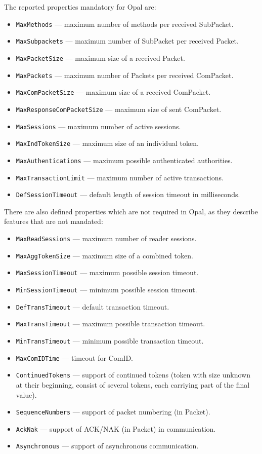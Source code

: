 The reported properties mandatory for Opal are:
\begin{itemize}
\item \verb|MaxMethods| --- maximum number of methods per received SubPacket.
\item \verb|MaxSubpackets| --- maximum number of SubPacket per received Packet.
\item \verb|MaxPacketSize| --- maximum size of a received Packet.
\item \verb|MaxPackets| --- maximum number of Packets per received ComPacket.
\item \verb|MaxComPacketSize| --- maximum size of a received ComPacket.
\item \verb|MaxResponseComPacketSize| --- maximum size of sent ComPacket.
\item \verb|MaxSessions| --- maximum number of active sessions.
\item \verb|MaxIndTokenSize| --- maximum size of an individual token.
\item \verb|MaxAuthentications| --- maximum possible authenticated authorities.
\item \verb|MaxTransactionLimit| --- maximum number of active transactions.
\item \verb|DefSessionTimeout| --- default length of session timeout in milliseconds.
\end{itemize}

There are also defined properties which are not required in Opal, as they describe features that are not mandated:
\begin{itemize}
\item \verb|MaxReadSessions| --- maximum number of reader sessions.
\item \verb|MaxAggTokenSize| --- maximum size of a combined token.
\item \verb|MaxSessionTimeout| --- maximum possible session timeout.
\item \verb|MinSessionTimeout| --- minimum possible session timeout.
\item \verb|DefTransTimeout| --- default transaction timeout.
\item \verb|MaxTransTimeout| --- maximum possible transaction timeout.
\item \verb|MinTransTimeout| --- minimum possible transaction timeout.
\item \verb|MaxComIDTime| --- timeout for ComID.
\item \verb|ContinuedTokens| --- support of continued tokens (token with size unknown at their beginning, consist of several tokens, each carriying part of the final value).
\item \verb|SequenceNumbers| --- support of packet numbering (in Packet).
\item \verb|AckNak| --- support of ACK/NAK (in Packet) in communication.
\item \verb|Asynchronous| --- support of asynchronous communication.
\end{itemize}


